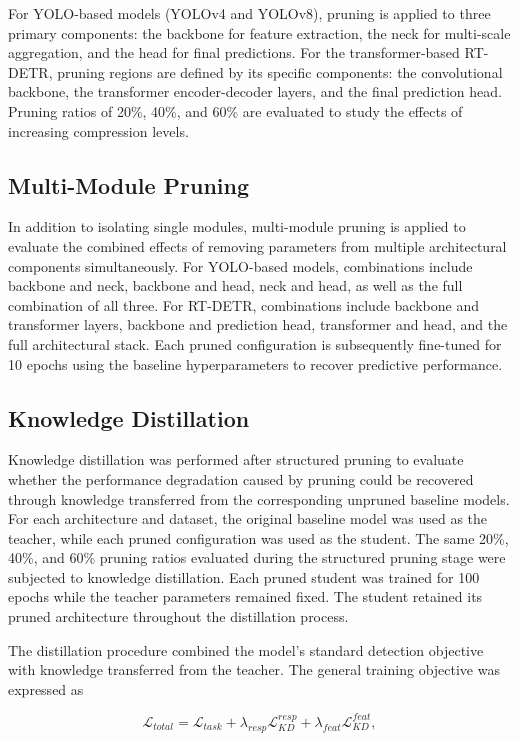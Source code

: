 For YOLO-based models (YOLOv4 and YOLOv8), pruning is applied to three primary components: the backbone for feature extraction, the neck for multi-scale aggregation, and the head for final predictions. For the transformer-based RT-DETR, pruning regions are defined by its specific components: the convolutional backbone, the transformer encoder-decoder layers, and the final prediction head. Pruning ratios of 20\%, 40\%, and 60\% are evaluated to study the effects of increasing compression levels. 

\subsection{Multi-Module Pruning}
In addition to isolating single modules, multi-module pruning is applied to evaluate the combined effects of removing parameters from multiple architectural components simultaneously. For YOLO-based models, combinations include backbone and neck, backbone and head, neck and head, as well as the full combination of all three. For RT-DETR, combinations include backbone and transformer layers, backbone and prediction head, transformer and head, and the full architectural stack. Each pruned configuration is subsequently fine-tuned for 10 epochs using the baseline hyperparameters to recover predictive performance.

\subsection{Knowledge Distillation}

Knowledge distillation was performed after structured pruning to evaluate whether the performance degradation caused by pruning could be recovered through knowledge transferred from the corresponding unpruned baseline models. For each architecture and dataset, the original baseline model was used as the teacher, while each pruned configuration was used as the student. The same 20\%, 40\%, and 60\% pruning ratios evaluated during the structured pruning stage were subjected to knowledge distillation. Each pruned student was trained for 100 epochs while the teacher parameters remained fixed. The student retained its pruned architecture throughout the distillation process.

The distillation procedure combined the model's standard detection objective with knowledge transferred from the teacher. The general training objective was expressed as

$$
\mathcal{L}_{total}
=
\mathcal{L}_{task}
+
\lambda_{resp}\mathcal{L}_{KD}^{resp}
+
\lambda_{feat}\mathcal{L}_{KD}^{feat},
$$

